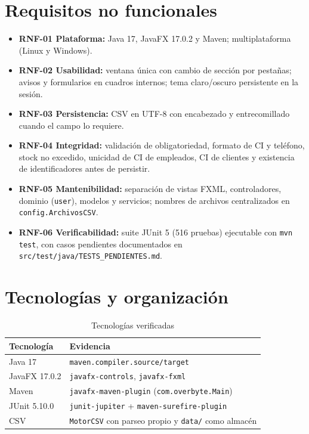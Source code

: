 \section{Requisitos no funcionales}
\begin{itemize}
\item \textbf{RNF-01 Plataforma:} Java 17, JavaFX 17.0.2 y Maven; multiplataforma (Linux y Windows).
\item \textbf{RNF-02 Usabilidad:} ventana única con cambio de sección por pestañas; avisos y formularios en cuadros internos; tema claro/oscuro persistente en la sesión.
\item \textbf{RNF-03 Persistencia:} CSV en UTF-8 con encabezado y entrecomillado cuando el campo lo requiere.
\item \textbf{RNF-04 Integridad:} validación de obligatoriedad, formato de CI y teléfono, stock no excedido, unicidad de CI de empleados, CI de clientes y existencia de identificadores antes de persistir.
\item \textbf{RNF-05 Mantenibilidad:} separación de vistas FXML, controladores, dominio (\texttt{user}), modelos y servicios; nombres de archivos centralizados en \texttt{config.ArchivosCSV}.
\item \textbf{RNF-06 Verificabilidad:} suite JUnit 5 (516 pruebas) ejecutable con \texttt{mvn test}, con casos pendientes documentados en \texttt{src/test/java/TESTS\_PENDIENTES.md}.
\end{itemize}

\section{Tecnologías y organización}
\begin{table}[H]\centering\caption{Tecnologías verificadas}\begin{tabular}{ll}\toprule Tecnología & Evidencia\\\midrule
Java 17 & \texttt{maven.compiler.source/target}\\
JavaFX 17.0.2 & \texttt{javafx-controls}, \texttt{javafx-fxml}\\
Maven & \texttt{javafx-maven-plugin} (\texttt{com.overbyte.Main})\\
JUnit 5.10.0 & \texttt{junit-jupiter} + \texttt{maven-surefire-plugin}\\
CSV & \texttt{MotorCSV} con parseo propio y \texttt{data/} como almacén\\\bottomrule\end{tabular}\end{table}
